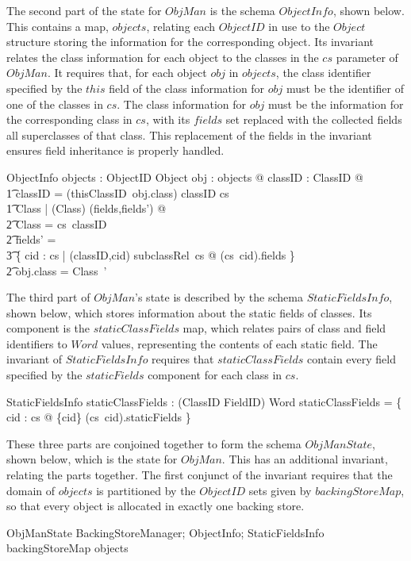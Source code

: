 The second part of the state for $ObjMan$ is the schema $ObjectInfo$,
shown below.
This contains a map, $objects$, relating each $ObjectID$ in use to the
$Object$ structure storing the information for the corresponding
object.
Its invariant relates the class information for each object to the
classes in the $cs$ parameter of $ObjMan$.
It requires that, for each object $obj$ in $objects$, the class
identifier specified by the $this$ field of the class information for
$obj$ must be the identifier of one of the classes in $cs$.
The class information for $obj$ must be the information for the
corresponding class in $cs$, with its $fields$ set replaced with the
collected fields all superclasses of that class.
This replacement of the fields in the invariant ensures field
inheritance is properly handled.
\begin{schema}{ObjectInfo}
	objects : ObjectID \pfun Object
\where
	\forall obj : \ran objects @ \exists classID : ClassID @ \\
	\t1 classID = (thisClassID~obj.class) \land classID \in \dom cs \land \\
	\t1 \exists \Delta Class | (\Xi Class) \hide (fields,fields') @ \\
	\t2 \theta Class = cs~classID \land \\
	\t2 fields' = {} \\
	\t3 \bigcup \{ cid : \dom cs | (classID,cid) \in subclassRel~cs @ (cs~cid).fields \} \land \\
	\t2 obj.class = \theta Class~'
\end{schema}
      
The third part of $ObjMan$'s state is described by the schema
$StaticFieldsInfo$, shown below, which stores information about the
static fields of classes.
Its component is the $staticClassFields$ map, which relates pairs of
class and field identifiers to $Word$ values, representing the
contents of each static field.
The invariant of $StaticFieldsInfo$ requires that $staticClassFields$
contain every field specified by the $staticFields$ component for each
class in $cs$.
\begin{schema}{StaticFieldsInfo}
	staticClassFields : (ClassID \cross FieldID) \pfun Word
\where
	\dom staticClassFields = \bigcup \{ cid : \dom cs @ \{cid\} \cross (cs~cid).staticFields \}
\end{schema}

These three parts are conjoined together to form the schema
$ObjManState$, shown below, which is the state for $ObjMan$.
This has an additional invariant, relating the parts together.
The first conjunct of the invariant requires that the domain of
$objects$ is partitioned by the $ObjectID$ sets given by
$backingStoreMap$, so that every object is allocated in exactly one
backing store.
\begin{schema}{ObjManState}
	BackingStoreManager; ObjectInfo; StaticFieldsInfo
\where
	backingStoreMap \partition \dom objects
\end{schema}

